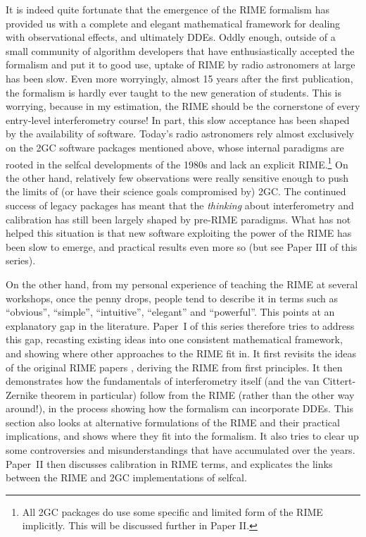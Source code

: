 \documentclass[referee]{aa}
\begin{document}
It is indeed quite fortunate that the emergence of the RIME formalism has provided us with a complete and elegant mathematical framework for dealing with observational effects, and ultimately DDEs. Oddly enough, outside of a small community of algorithm developers that have enthusiastically accepted the formalism and put it to good use, uptake of RIME by radio astronomers at large has been slow. Even more worryingly, almost 15 years after the first publication, the formalism is hardly ever taught to the new generation of students. This is worrying, because in my estimation, the RIME should be the cornerstone of every entry-level interferometry course! In part, this slow acceptance has been shaped by the availability of software. Today's radio astronomers rely almost exclusively on the 2GC software packages mentioned above, whose internal paradigms are rooted in the selfcal developments of the 1980s and lack an explicit RIME.\footnote{All 2GC packages do use some specific and limited form of the RIME implicitly. This will be discussed further in Paper II.} On the other hand, relatively few observations were really sensitive enough to push the limits of (or have their science goals compromised by) 2GC. The continued success of legacy packages has meant that the {\em thinking} about interferometry and calibration has still been largely shaped by pre-RIME paradigms. What has not helped this situation is that new software exploiting the power of the RIME has been slow to emerge, and practical results even more so (but see Paper III of this series).  

On the other hand, from my personal experience of teaching the RIME at several workshops, once the penny drops, people tend to describe it in terms such as ``obvious'', ``simple'', ``intuitive'', ``elegant'' and ``powerful''. This points at an explanatory gap in the literature. Paper~I of this series therefore tries to address this gap, recasting existing ideas into one consistent mathematical framework, and showing where other approaches to the RIME fit in. It first revisits the ideas of the original RIME papers \citep{ME1,ME4}, deriving the RIME from first principles. It then demonstrates how the fundamentals of interferometry itself (and the van Cittert-Zernike theorem in particular) follow from the RIME (rather than the other way around!), in the process showing how the formalism can incorporate DDEs. This section also looks at alternative formulations of the RIME and their practical implications, and shows where they fit into the formalism. It also tries to clear up some controversies and misunderstandings that have accumulated over the years. Paper~II then discusses calibration in RIME terms, and explicates the links between the RIME and 2GC implementations of selfcal. 
\end{document}

